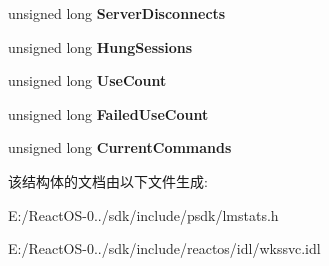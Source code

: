 \begin{DoxyCompactItemize}
unsigned long {\bfseries Server\+Disconnects}
\item 
\mbox{\label{struct___s_t_a_t___w_o_r_k_s_t_a_t_i_o_n__0_a71ebb03202055192786a5b3b53942d54}} 
unsigned long {\bfseries Hung\+Sessions}
\item 
\mbox{\label{struct___s_t_a_t___w_o_r_k_s_t_a_t_i_o_n__0_a27e6b11de166aa33a7638b2a4b6d2334}} 
unsigned long {\bfseries Use\+Count}
\item 
\mbox{\label{struct___s_t_a_t___w_o_r_k_s_t_a_t_i_o_n__0_af8ab42246fa38b786e33a5fd122d7f5a}} 
unsigned long {\bfseries Failed\+Use\+Count}
\item 
\mbox{\label{struct___s_t_a_t___w_o_r_k_s_t_a_t_i_o_n__0_ac361188893c73f01badcec2c7d41d3e8}} 
unsigned long {\bfseries Current\+Commands}
\end{DoxyCompactItemize}


该结构体的文档由以下文件生成\+:\begin{DoxyCompactItemize}
\item 
E\+:/\+React\+O\+S-\/0../sdk/include/psdk/lmstats.\+h\item 
E\+:/\+React\+O\+S-\/0../sdk/include/reactos/idl/wkssvc.\+idl\end{DoxyCompactItemize}
